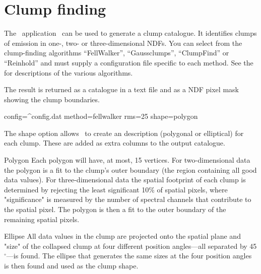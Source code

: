 \section{Clump finding}
\label{sec:clumps}
\label{sec:clumpfind}

The \cupid\ application \findclumps\ can be used to generate a clump
catalogue. It identifies clumps of emission in one-, two- or
three-dimensional NDFs. You can select from the clump-finding
algorithms ``FellWalker''\cite{fellwalker}, ``Gaussclumps'',
``ClumpFind'' or ``Reinhold'' and must supply a configuration file
specific to each method. See the 
for descriptions of the various algorithms.

The result is returned as a catalogue in a text file and as a NDF
pixel mask showing the clump boundaries.

\begin{terminalv}
  config=^config.dat method=fellwalker rms=25 shape=polygon
\end{terminalv}

The shape option allows \findclumps\ to create an
description (polygonal or elliptical) for each clump. These are added
as extra columns to the output catalogue.

\begin{aligndesc}
\item[Polygon] Each polygon will have, at most, 15 vertices. For
  two-dimensional data the polygon is a fit to the clump's outer
  boundary (the region containing all good data values). For
  three-dimensional data the spatial footprint of each clump is
  determined by rejecting the least significant 10\% of spatial
  pixels, where "significance" is measured by the number of spectral
  channels that contribute to the spatial pixel. The polygon is then a
  fit to the outer boundary of the remaining spatial pixels.

\item[Ellipse] All data values in the clump are projected onto the
  spatial plane and "size" of the collapsed clump at four different
  position angles---all separated by 45$^\circ$---is found. The
  ellipse that generates the same sizes at the four position angles is
  then found and used as the clump shape.
\end{aligndesc}



